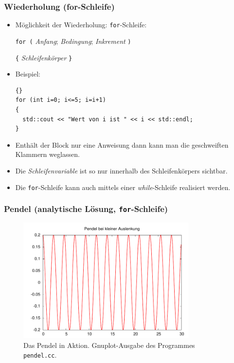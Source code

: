 \begin{frame}[fragile]
\frametitle{Wiederholung (for-Schleife)}
\begin{itemize}
\item Möglichkeit der Wiederholung: \lstinline{for}-Schleife:

\lstinline{for (} \textsl{Anfang}; \textsl{Bedingung};
\textsl{Inkrement} \lstinline{)}

\lstinline!{! \textsl{Schleifenkörper} \lstinline!}!
\item Beispiel:
{\scriptsize\begin{lstlisting}{}
for (int i=0; i<=5; i=i+1)
{
  std::cout << "Wert von i ist " << i << std::endl;
}
\end{lstlisting}}
\item Enthält der Block nur eine Anweisung dann kann man die
  geschweiften Klammern weglassen.
\item Die \textsl{Schleifenvariable} ist so nur innerhalb des
  Schleifenkörpers sichtbar.
\item Die \lstinline{for}-Schleife kann auch mittels einer
  \textsl{while}-Schleife realisiert werden.
\end{itemize}
\end{frame}

\begin{frame}[fragile]
\frametitle{Pendel (analytische Lösung, \lstinline{for}-Schleife)}

\end{frame}

 {
  \begin{figure}
    \begin{center}
      \includegraphics[width=0.8\textwidth]{./programmierkurs/pendel}
    \end{center}
    \caption{Das Pendel in Aktion. Gnuplot-Ausgabe des Programmes \lstinline{pendel.cc}.}
    \label{programmierkurs:fig:pendel}
  \end{figure}
}

